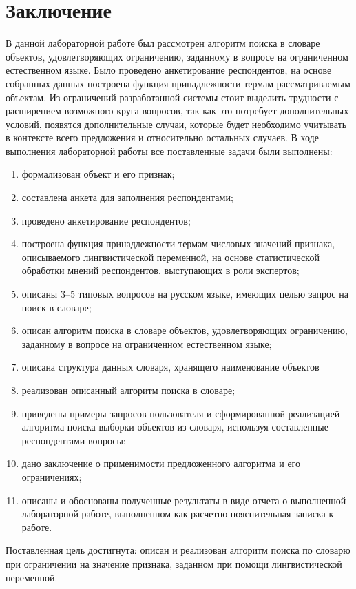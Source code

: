 \chapter*{Заключение}
В данной лабораторной работе был рассмотрен алгоритм поиска в словаре объектов,
удовлетворяющих ограничению, заданному в вопросе на ограниченном естественном языке.
Было проведено анкетирование респондентов, на основе собранных данных построена функция принадлежности термам рассматриваемым объектам.
Из ограничений разработанной системы стоит выделить трудности с расширением возможного круга
вопросов, так как это потребует дополнительных условий, появятся дополнительные случаи, которые будет необходимо учитывать в контексте всего предложения и относительно остальных случаев.
В ходе выполнения лабораторной работы все поставленные задачи были
выполнены:
\begin{enumerate}[ 1{)}]
	\item формализован объект и его признак;
\item составлена анкета для заполнения респондентами;
\item проведено анкетирование респондентов;
\item построена функция принадлежности термам числовых значений признака, описываемого лингвистической переменной, на основе статистической обработки мнений респондентов, выступающих в роли экспертов;
\item описаны 3–5 типовых вопросов на русском языке, имеющих целью запрос на поиск в словаре;
\item описан алгоритм поиска в словаре объектов, удовлетворяющих ограничению, заданному в вопросе на ограниченном естественном языке;
\item описана структура данных словаря, хранящего наименование объектов
 \item реализован описанный алгоритм поиска в словаре;
 \item приведены примеры запросов пользователя и сформированной реализацией алгоритма поиска выборки объектов из словаря, используя составленные респондентами вопросы;
 \item дано заключение о применимости предложенного алгоритма и его ограничениях;
 \item описаны и обоснованы полученные результаты в виде отчета о выполненной лабораторной работе, выполненном как расчетно-пояснительная записка к работе.
\end{enumerate}
 Поставленная цель достигнута: описан и реализован алгоритм поиска по словарю при ограничении на значение признака, заданном при помощи лингвистической переменной.
